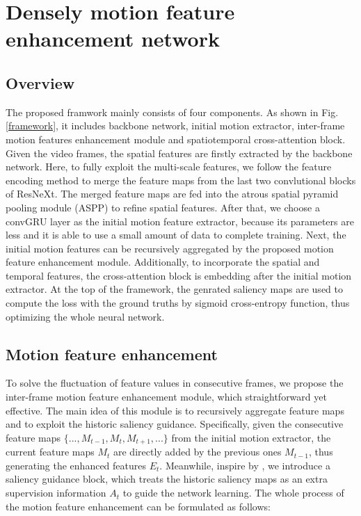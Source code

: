 \documentclass[12pt]{article}
\begin{document}
\section{Densely motion feature enhancement network}

\subsection{Overview}

The proposed framwork mainly consists of four components. As shown in Fig.\ref{framework}, it includes backbone network, initial motion extractor, inter-frame motion features enhancement module and spatiotemporal cross-attention block. Given the video frames, the spatial features are firstly extracted by the backbone network. Here, to fully exploit the multi-scale features, we follow the feature encoding method \cite{fu2019dual} to merge the feature maps from the last two convlutional blocks of ResNeXt. The merged feature maps are fed into the atrous spatial pyramid pooling module (ASPP) \cite{chen2017rethinking} to refine spatial features. After that, we choose a convGRU layer as the initial motion feature extractor, because its parameters are less and it is able to use a small amount of data to complete training. Next, the initial motion features can be recursively aggregated by the proposed motion feature enhancement module. Additionally, to incorporate the spatial and temporal features, the cross-attention block is embedding after the initial motion extractor. At the top of the framework, the genrated saliency maps are used to compute the loss with the ground truths by sigmoid cross-entropy function, thus optimizing the whole neural network.  

\subsection{Motion feature enhancement}

To solve the fluctuation of feature values in consecutive frames, we propose the inter-frame motion feature enhancement module, which straightforward yet effective. The main idea of this module is to recursively aggregate feature maps and to exploit the historic saliency guidance. Specifically, given the consecutive feature maps $\{..., M_{t-1}, M_{t}, M_{t+1}, ...\}$ from the initial motion extractor, the current feature maps $M_{t}$ are directly added by the previous ones $M_{t-1}$, thus generating the enhanced features $E_{t}$. Meanwhile, inspire by \cite{deng2018r3net}, we introduce a saliency guidance block, which treats the historic saliency maps as an extra supervision information $A_t$ to guide the network learning. The whole process of the motion feature enhancement can be formulated as follows:  
\end{document}
